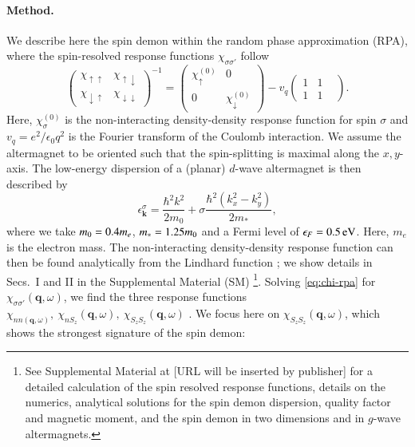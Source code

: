 \documentclass[aps,prl,reprint,twocolumns,superscriptaddress]{revtex4-2}
\DeclareMathOperator{\Imm}{Im}
\newcommand{\subfigref}[2]{Fig.~\hyperref[#1]{\ref*{#1}#2}}
\begin{document}
	
	
	
	
	
	
	\paragraph{Method.}
	We describe here the spin demon within the random phase approximation (RPA), where the spin-resolved response functions $\chi_{\sigma\sigma'}$ follow \cite{giulianiQuantumTheoryElectron2005}
	\begin{equation}
		\begin{pmatrix}
			\chi_{\uparrow\uparrow} & \chi_{\uparrow\downarrow} \\ 
			\chi_{\downarrow\uparrow} & \chi_{\downarrow\downarrow}
		\end{pmatrix}^{-1} = \begin{pmatrix}
			\chi_\uparrow^{(0)} & 0 \\
			0 & \chi_\downarrow^{(0)}
		\end{pmatrix}
		- v_q \begin{pmatrix}
			1 & 1 & \\ 1 & 1 
		\end{pmatrix} \label{eq:chi-rpa}.
	\end{equation}
	Here, $\chi_\sigma^{(0)}$ is the non-interacting density-density response function for spin $\sigma$ and $v_q=e^2/\epsilon_0 q^2$ is the Fourier transform of the Coulomb interaction. We assume the altermagnet to be oriented such that the spin-splitting is maximal along the $x,y$-axis. The low-energy dispersion of a (planar) $d$-wave altermagnet is then described by \cite{smejkalEmergingResearchLandscape2022}
	\begin{equation}
		\epsilon_{\bm k}^\sigma = \frac{\hbar^2 k^2}{2m_0} + \sigma\frac{\hbar^2 \left( k_x^2-k_y^2\right)}{2m_*} ,
	\end{equation}
	where we take $m_0=0.4 m_e$, $m_*=1.25 m_0$ and a Fermi level of $\epsilon_F=\SI{0.5}{eV}$. Here, $m_e$ is the electron mass.
	The non-interacting density-density response function can then be found analytically from the Lindhard function \cite{ahnAnisotropicFermionicQuasiparticles2021}; we show details in Secs.~I and II in the Supplemental Material (SM) \footnote{See Supplemental Material at [URL will be inserted by publisher] for a detailed calculation of the spin resolved response functions, details on the numerics, analytical solutions for the spin demon dispersion, quality factor and magnetic moment, and the spin demon in two dimensions and in $g$-wave altermagnets.}. Solving \cref{eq:chi-rpa} for $\chi_{\sigma\sigma'}(\bm q,\omega)$, we find the three response functions $\chi_{nn(\bm q,\omega)},\ \chi_{nS_z}(\bm q,\omega),\ \chi_{S_zS_z}(\bm q,\omega)$ \cite{giulianiQuantumTheoryElectron2005}. We focus here on $\chi_{S_zS_z}(\bm q,\omega)$, which shows the strongest signature of the spin demon:
\end{document}
